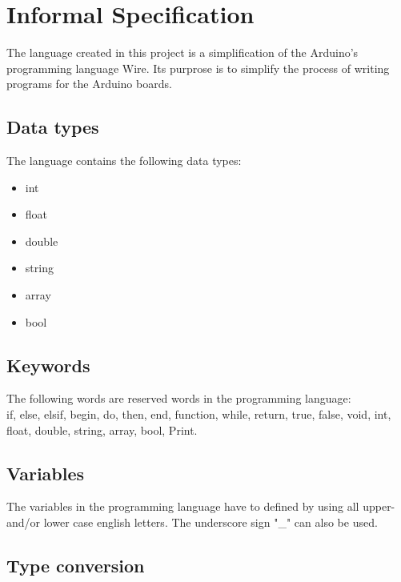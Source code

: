 \section{Informal Specification}\label{analysis:informal-specification}

The language created in this project is a simplification of the Arduino's programming language Wire. Its purprose is to simplify the process of writing programs for the Arduino boards.   

\subsection{Data types}
The language contains the following data types: 
\begin{itemize}
\item int
\item float
\item double
\item string
\item array
\item bool
\end{itemize}

\subsection{Keywords}
The following words are reserved words in the programming language:\\
if, else, elsif, begin, do, then, end, function, while, return, true, false, void, int, float, double, string, array, bool, Print.

\subsection{Variables}
The variables in the programming language have to defined by using all upper- and/or lower case english letters. The underscore sign "\_" can also be used. 

\subsection{Type conversion}
